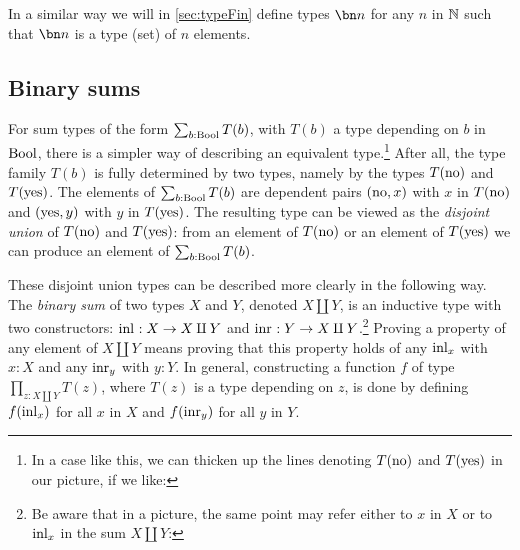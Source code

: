 In a similar way we will in \cref{sec:typeFin} define types $\bn n$ for any $n$ in $\mathbb{N}$
such that $\bn n$ is a type (set) of $n$ elements.


\subsection{Binary sums}
\label{sec:binsum-types}
For sum types of the form $\sum_{b:\mathrm{Bool}} T(b)$, with $T(b)$
a type depending on $b$ in $\mathrm{Bool}$, there is a simpler way of
describing an equivalent type.\footnote{%
  In a case like this, we can thicken up the lines denoting
  $T(\mathrm{no})$ and $T(\mathrm{yes})$ in our picture, if we like:\par
  }
After all, the type family $T(b)$ is fully determined
by two types, namely by the types $T(\mathrm{no})$ and $T(\mathrm{yes})$.
The elements of $\sum_{b:\mathrm{Bool}} T(b)$ are dependent pairs $(\mathrm{no},x)$ with
$x$ in $T(\mathrm{no})$ and $(\mathrm{yes},y)$ with $y$ in $T(\mathrm{yes})$. The resulting
type can be viewed as the \emph{disjoint union} of $T(\mathrm{no})$ and $T(\mathrm{yes})$:
from an element of $T(\mathrm{no})$ or an element of $T(\mathrm{yes})$
we can produce an element of $\sum_{b:\mathrm{Bool}} T(b)$.

These disjoint union types can be described more clearly in the following way.
The \emph{binary sum} of two types $X$ and $Y$, denoted $X \amalg Y$,
is an inductive type with two constructors: $\inl{} : X \to X \amalg Y$ and
$\inr{} : Y \to X \amalg Y$.\footnote{%
  Be aware that in a picture, the same point may refer
  either to $x$ in $X$ or to $\inl x$ in the sum $X \amalg Y$:\par
  }
Proving a property of any element of $X \amalg Y$
means proving that this property holds of any $\inl{x}$ with $x:X$ and any
$\inr{y}$ with $y:Y$. In general, constructing a function $f$ of type
$\prod_{z: X \amalg Y} T(z)$, where $T(z)$ is a type depending on
$z$, is done by defining $f(\inl{x})$ for all $x$ in $X$
and $f(\inr{y})$ for all $y$ in $Y$.

